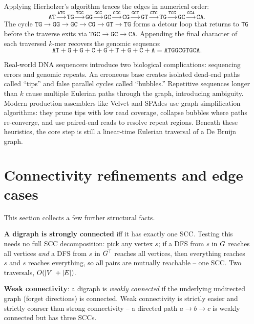 Applying Hierholzer's algorithm traces the edges in numerical order:
\[
\texttt{AT} \xrightarrow{\texttt{ATG}} \texttt{TG} \xrightarrow{\texttt{TGG}} \texttt{GG} \xrightarrow{\texttt{GGC}} \texttt{GC} \xrightarrow{\texttt{GCG}} \texttt{CG} \xrightarrow{\texttt{CGT}} \texttt{GT} \xrightarrow{\texttt{GTG}} \texttt{TG} \xrightarrow{\texttt{TGC}} \texttt{GC} \xrightarrow{\texttt{GCA}} \texttt{CA}.
\]
The cycle $\texttt{TG} \to \texttt{GG} \to \texttt{GC} \to \texttt{CG} \to \texttt{GT} \to \texttt{TG}$ forms a detour loop that returns to \texttt{TG} before the traverse exits via $\texttt{TGC} \to \texttt{GC} \to \texttt{CA}$. Appending the final character of each traversed $k$-mer recovers the genomic sequence:
\[
\texttt{AT} + \texttt{G} + \texttt{G} + \texttt{C} + \texttt{G} + \texttt{T} + \texttt{G} + \texttt{C} + \texttt{A} = \texttt{ATGGCGTGCA}.
\]

\begin{applicationbox}
Real-world DNA sequencers introduce two biological complications: sequencing errors and genomic repeats. An erroneous base creates isolated dead-end paths called ``tips'' and false parallel cycles called ``bubbles.'' Repetitive sequences longer than $k$ cause multiple Eulerian paths through the graph, introducing ambiguity. Modern production assemblers like Velvet and SPAdes use graph simplification algorithms: they prune tips with low read coverage, collapse bubbles where paths re-converge, and use paired-end reads to resolve repeat regions. Beneath these heuristics, the core step is still a linear-time Eulerian traversal of a De Bruijn graph.
\end{applicationbox}

\section{Connectivity refinements and edge cases}
\label{ch05:refinements}

This section collects a few further structural facts.

\textbf{A digraph is strongly connected} iff it has exactly one SCC. Testing this needs no full SCC decomposition: pick any vertex $s$; if a DFS from $s$ in $G$ reaches all vertices \emph{and} a DFS from $s$ in $G^{\!\top}$ reaches all vertices, then everything reaches $s$ and $s$ reaches everything, so all pairs are mutually reachable -- one SCC. Two traversals, $O(\lvert V\rvert+\lvert E\rvert)$.

\textbf{Weak connectivity}: a digraph is \emph{weakly connected} if the underlying undirected graph (forget directions) is connected. Weak connectivity is strictly easier and strictly coarser than strong connectivity -- a directed path $a\to b\to c$ is weakly connected but has three SCCs.


